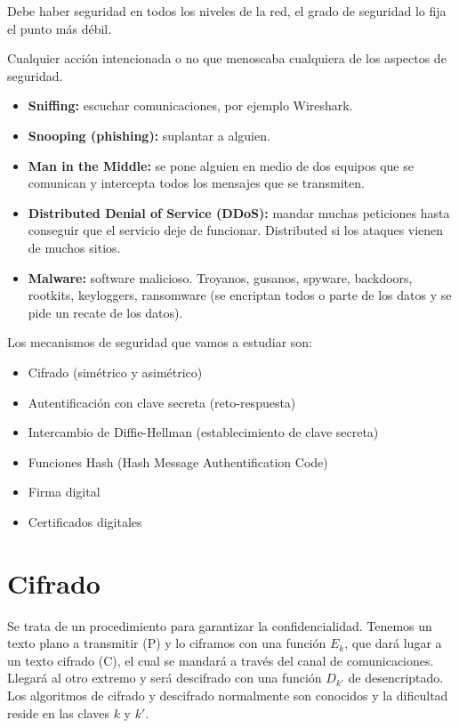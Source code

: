 Debe haber seguridad en todos los niveles de la red, el grado de seguridad lo fija el punto más débil. 

\begin{definicion}
    Cualquier acción intencionada o no que menoscaba cualquiera de los aspectos de seguridad. 
\end{definicion}

\begin{itemize}
    \item \textbf{Sniffing:} escuchar comunicaciones, por ejemplo Wireshark.
    \item \textbf{Snooping (phishing):} suplantar a alguien.
    \item \textbf{Man in the Middle:} se pone alguien en medio de dos equipos que se comunican y intercepta todos los mensajes que se transmiten.
    \item \textbf{Distributed Denial of Service (DDoS):} mandar muchas peticiones hasta conseguir que el servicio deje de funcionar. Distributed si los ataques vienen de muchos sitios. 
    \item \textbf{Malware:} software malicioso. Troyanos, gusanos, spyware, backdoors, rootkits, keyloggers, ransomware (se encriptan todos o parte de los datos y se pide un recate de los datos).
\end{itemize}


Los mecanismos de seguridad que vamos a estudiar son:
\begin{itemize}
    \item Cifrado (simétrico y asimétrico)
    \item Autentificación con clave secreta (reto-respuesta)
    \item Intercambio de Diffie-Hellman (establecimiento de clave secreta)
    \item Funciones Hash (Hash Message Authentification Code)
    \item Firma digital
    \item Certificados digitales
\end{itemize}

\section{Cifrado}
Se trata de un procedimiento para garantizar la confidencialidad. 
Tenemos un texto plano a transmitir (P) y lo ciframos con una función $E_k$, que dará lugar a un texto cifrado (C), el cual se mandará a través del canal de comunicaciones. Llegará al otro extremo y será descifrado con una función $D_{k'}$ de desencriptado. 
Los algoritmos de cifrado y descifrado normalmente son conocidos y la dificultad reside en las claves $k$ y $k'$. 

